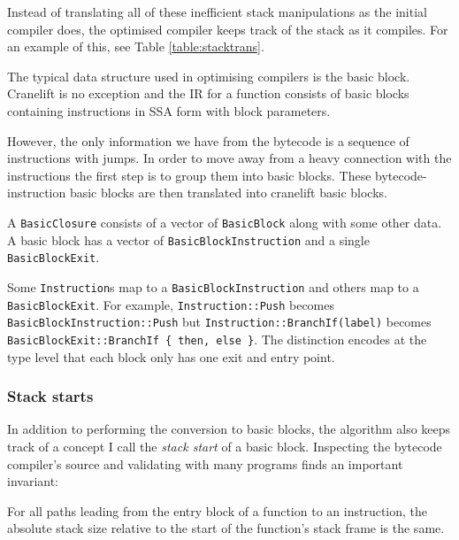Instead of translating all of these inefficient stack manipulations as the initial compiler does,
the optimised compiler keeps track of the stack as it compiles. For an example of this, see Table
\ref{table:stacktrans}.

\label{opt-bb}

The typical data structure used in optimising compilers is the basic block. Cranelift is no
exception and the IR for a function consists of basic blocks containing instructions in SSA form
with block parameters.

However, the only information we have from the bytecode is a sequence of instructions with jumps.
In order to move away from a heavy connection with the instructions the first step is to group them
into basic blocks. These bytecode-instruction basic blocks are then translated into cranelift basic
blocks.


A \texttt{BasicClosure} consists of a vector of \texttt{BasicBlock} along with
some other data. A basic block has a vector of \texttt{BasicBlockInstruction} and a single
\texttt{BasicBlockExit}.

Some \texttt{Instruction}s map to a \texttt{BasicBlockInstruction} and others map to a
\texttt{BasicBlockExit}. For example, \texttt{Instruction::Push} becomes
\texttt{BasicBlockInstruction::Push} but \texttt{Instruction::BranchIf(label)} becomes
\texttt{BasicBlockExit::BranchIf \{ then, else \}}. The distinction encodes
at the type level that each block only has one exit and entry point.

\subsubsection{Stack starts}

In addition to performing the conversion to basic blocks, the algorithm also keeps track of a
concept I call the \emph{stack start} of a basic block. Inspecting the bytecode compiler's source
and validating with many programs finds an important invariant:

\begin{framed}
      \noindent
      For all paths leading from the entry block of a function to an instruction, the absolute
      stack size
      relative to the start of the function's stack frame is the same.
\end{framed}


